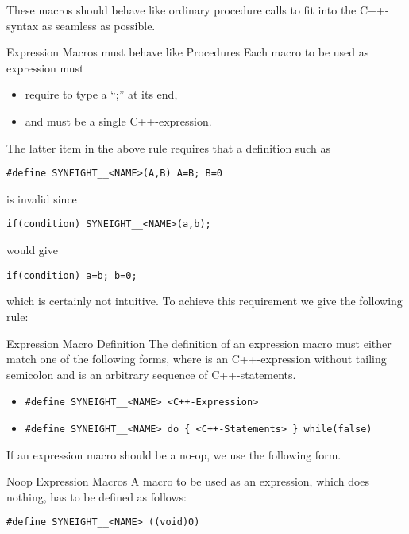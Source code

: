 These macros should behave like ordinary procedure calls to fit into
the C++-syntax as seamless as possible. 
%
\begin{rule*}{Expression Macros must behave like Procedures}
  Each macro to be used as expression must 
  \begin{itemize}
  \item require to type a ``;'' at its end,
  \item and must be a single C++-expression.
  \end{itemize}
\end{rule*}
The latter item in the above rule requires that a definition such as 
\begin{verbatim}
#define SYNEIGHT__<NAME>(A,B) A=B; B=0 
\end{verbatim}
is invalid since 
\begin{verbatim}
if(condition) SYNEIGHT__<NAME>(a,b);
\end{verbatim}
would give 
\begin{verbatim}
if(condition) a=b; b=0;
\end{verbatim}
which is certainly not intuitive. 
%
To achieve this requirement we give the following rule:
\begin{rule*}{Expression Macro Definition}
  The definition of an expression macro must either match one of the
  following forms, where {\tt <C++-Expression>} is an C++-expression
  without tailing semicolon and {\tt <C++-Statements>} is an arbitrary
  sequence of C++-statements.
  \begin{itemize}
  \item \begin{verbatim}
#define SYNEIGHT__<NAME> <C++-Expression>
\end{verbatim}
    \item 
\begin{verbatim}
#define SYNEIGHT__<NAME> do { <C++-Statements> } while(false)
\end{verbatim}
  \end{itemize}
\end{rule*}
%
If an expression macro should be a no-op, we use the following form.
\begin{rule*}{Noop Expression Macros}
  A macro to be used as an expression, which does nothing, has to be
  defined as follows:
\begin{verbatim}
#define SYNEIGHT__<NAME> ((void)0)
\end{verbatim}
 \end{rule*}


